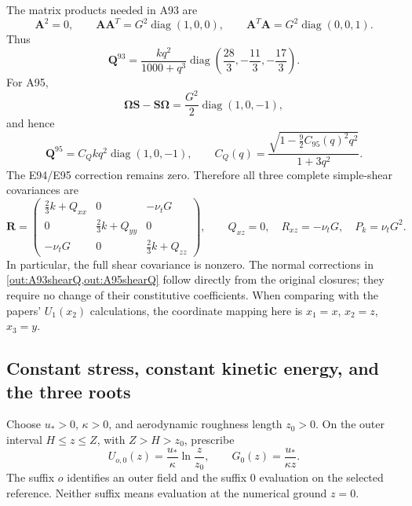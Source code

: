 \documentclass[11pt,a4paper]{article}
\numberwithin{equation}{section}
\newcommand{\ust}{u_*}
\newcommand{\nut}{\nu_t}
\newcommand{\R}{\boldsymbol R}
\newcommand{\Q}{\boldsymbol Q}
\newcommand{\Amat}{\boldsymbol A}
\newcommand{\Smat}{\boldsymbol S}
\newcommand{\Omat}{\boldsymbol\Omega}
\DeclareMathOperator{\diag}{diag}
\begin{document}
The matrix products needed in A93 are
\begin{equation}
 \Amat^2=0,\qquad
 \Amat\Amat^T=G^2\diag(1,0,0),\qquad
 \Amat^T\Amat=G^2\diag(0,0,1).
 \label{out:shearproducts}
\end{equation}
Thus
\begin{equation}
 \boxed{\Q^{93}=
 \frac{kq^2}{1000+q^3}\diag\left(\frac{28}3,-\frac{11}3,-\frac{17}3\right).}
 \label{out:A93shearQ}
\end{equation}
For A95,
\begin{equation}
 \Omat\Smat-\Smat\Omat=\frac{G^2}{2}\diag(1,0,-1),
\end{equation}
and hence
\begin{equation}
 \boxed{\Q^{95}=C_Qkq^2\diag(1,0,-1),\qquad
 C_Q(q)=\frac{\sqrt{1-\frac92 C_{95}(q)^2q^2}}{1+3q^2}.}
 \label{out:A95shearQ}
\end{equation}
The E94/E95 correction remains zero. Therefore all three complete
simple-shear covariances are
\begin{equation}
 \R=
 \begin{pmatrix}
  \tfrac23k+Q_{xx}&0&-\nut G\\
  0&\tfrac23k+Q_{yy}&0\\
  -\nut G&0&\tfrac23k+Q_{zz}
 \end{pmatrix},\qquad
 \boxed{Q_{xz}=0,\quad R_{xz}=-\nut G,\quad P_k=\nut G^2.}
 \label{out:shear}
\end{equation}
In particular, the full shear covariance is nonzero. The normal
corrections in \cref{out:A93shearQ,out:A95shearQ} follow directly from
the original closures; they require no change of their constitutive
coefficients. When comparing with the papers' $U_1(x_2)$ calculations,
the coordinate mapping here is $x_1=x$, $x_2=z$, $x_3=y$.

\subsection{Constant stress, constant kinetic energy, and the three roots}
\label{out:rootssection}

Choose $\ust>0$, $\kappa>0$, and aerodynamic roughness length $z_0>0$.
On the outer interval $H\le z\le Z$, with $Z>H>z_0$, prescribe
\begin{equation}
 U_{o,0}(z)=\frac{\ust}{\kappa}\ln\frac z{z_0},\qquad
 G_0(z)=\frac{\ust}{\kappa z}.
 \label{out:log}
\end{equation}
The suffix $o$ identifies an outer field and the suffix $0$ evaluation
on the selected reference. Neither suffix means evaluation at the
numerical ground $z=0$.
\end{document}
